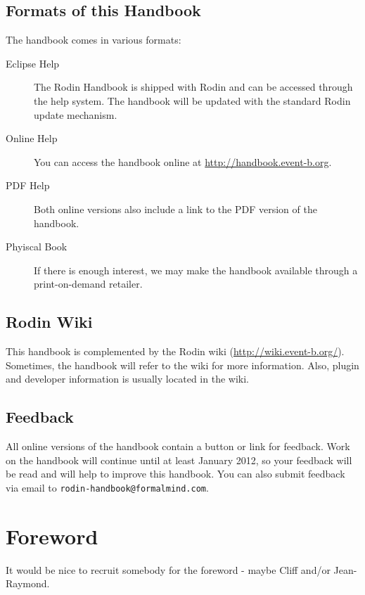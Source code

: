 \documentclass[12pt]{book}
\begin{document}
\subsection{Formats of this Handbook}
\label{handbook_formats}

The handbook comes in various formats:

\begin{description}
	\item[Eclipse Help] The Rodin Handbook is shipped with Rodin and can be accessed through the help system.  The handbook will be updated with the standard Rodin update mechanism.
	\item[Online Help] You can access the handbook online at \url{http://handbook.event-b.org}.
	\item[PDF Help] Both online versions also include a link to the PDF version of the handbook.
	\item[Phyiscal Book] If there is enough interest, we may make the handbook available through a print-on-demand retailer.
\end{description}

\subsection{Rodin Wiki}
\label{rodin_wiki}

This handbook is complemented by the Rodin wiki (\url{http://wiki.event-b.org/}).  Sometimes, the handbook will refer to the wiki for more information.  Also, plugin and developer information is usually located in the wiki.

\subsection{Feedback}
\label{feedback}

All online versions of the handbook contain a button or link for feedback.  Work on the handbook will continue until at least January 2012, so your feedback will be read and will help to improve this handbook.  You can also submit feedback via email to \texttt{rodin-handbook@formalmind.com}.

\section{Foreword}
\label{foreword}

It would be nice to recruit somebody for the foreword - maybe Cliff and/or Jean-Raymond.
\end{document}
